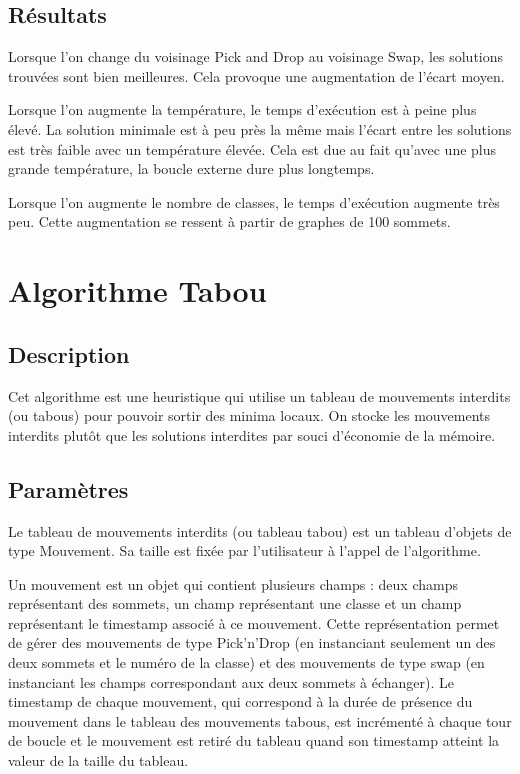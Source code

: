 \documentclass[12pt]{article}
\begin{document}
\subsection{Résultats}

Lorsque l’on change du voisinage Pick and Drop au voisinage Swap, les solutions trouvées sont bien meilleures. Cela provoque une augmentation de l'écart moyen.

Lorsque l’on augmente la température, le temps d’exécution est à peine plus élevé. La solution minimale est à peu près la même mais l’écart entre les solutions est très faible avec un température élevée. Cela est due au fait qu’avec une plus grande température, la boucle externe dure plus longtemps.

Lorsque l’on augmente le nombre de classes, le temps d'exécution augmente très peu. Cette augmentation se ressent à partir de graphes de 100 sommets.
  

\newpage

\section{Algorithme Tabou}
\subsection{Description}
Cet algorithme est une heuristique qui utilise un tableau de mouvements interdits (ou tabous) pour pouvoir sortir des minima locaux. On stocke les mouvements interdits plutôt que les solutions interdites par souci d’économie de la mémoire.

\subsection{Paramètres}
Le tableau de mouvements interdits (ou tableau tabou) est un tableau d’objets de type Mouvement. Sa taille est fixée par l’utilisateur à l’appel de l’algorithme.

Un mouvement est un objet qui contient plusieurs champs : deux champs représentant des sommets, un champ représentant une classe et un champ représentant le timestamp associé à ce mouvement. Cette représentation permet de gérer des mouvements de type Pick’n’Drop (en instanciant seulement un des deux sommets et le numéro de la classe) et des mouvements de type swap (en instanciant les champs correspondant aux deux sommets à échanger).
Le timestamp de chaque mouvement, qui correspond à la durée de présence du mouvement dans le tableau des mouvements tabous, est incrémenté à chaque tour de boucle et le mouvement est retiré du tableau quand son timestamp atteint la valeur de la taille du tableau.
\end{document}
